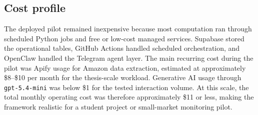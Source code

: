 \subsection{Cost profile}

The deployed pilot remained inexpensive because most computation ran through scheduled Python jobs and free or low-cost managed services. Supabase stored the operational tables, GitHub Actions handled scheduled orchestration, and OpenClaw handled the Telegram agent layer. The main recurring cost during the pilot was Apify usage for Amazon data extraction, estimated at approximately \$8--\$10 per month for the thesis-scale workload. Generative AI usage through \texttt{gpt-5.4-mini} was below \$1 for the tested interaction volume. At this scale, the total monthly operating cost was therefore approximately \$11 or less, making the framework realistic for a student project or small-market monitoring pilot.
